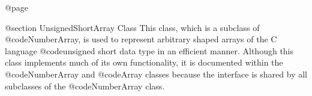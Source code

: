 @page

@section  UnsignedShortArray Class
This class, which is a subclass of @code{NumberArray}, is used to
represent arbitrary shaped arrays of the C language @code{unsigned
short} data type in an efficient manner.  Although this class implements
much of its own functionality, it is documented within the
@code{NumberArray} and @code{Array} classes because the interface is
shared by all subclasses of the @code{NumberArray} class.









